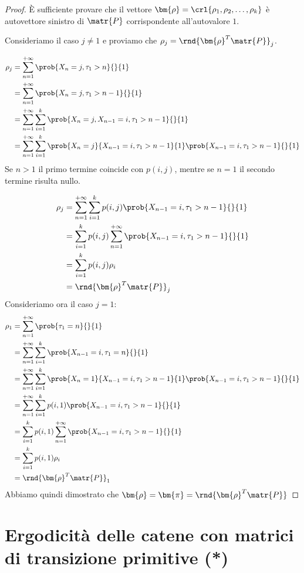\documentclass[\main/main.tex]{subfiles}
\begin{document}
\begin{proof}
	È sufficiente provare che il vettore \(\bm{\rho} = \crl{\rho_1, \rho_2, \ldots, \rho_k}\) è autovettore sinistro di \(\matr{P}\) corrispondente all'autovalore \(1\).

	Consideriamo il caso \(j \neq 1\) e proviamo che \(\rho_j = \rnd{\bm{\rho}^T\matr{P}}_j\).

	\begin{align*}
		\rho_j & = \sum_{n=1}^{+\infty} \prob{X_n = j, \tau_1 > n}{}{1}                                                                  \\
		       & = \sum_{n=1}^{+\infty} \prob{X_n = j, \tau_1 > n-1}{}{1}                                                                \\
		       & = \sum_{n=1}^{+\infty} \sum_{i=1}^{k} \prob{X_n = j, X_{n-1} = i, \tau_1 > n-1}{}{1}                                    \\
		       & = \sum_{n=1}^{+\infty} \sum_{i=1}^{k} \prob{X_n = j}{X_{n-1} = i, \tau_1 > n-1}{1}\prob{X_{n-1} = i, \tau_1 > n-1}{}{1} \\
	\end{align*}
	Se \(n>1\) il primo termine coincide con \(p(i,j)\), mentre se \(n=1\) il secondo termine risulta nullo.

	\begin{align*}
		\rho_j & = \sum_{n=1}^{+\infty} \sum_{i=1}^{k} p(i,j) \prob{X_{n-1} = i, \tau_1 > n-1}{}{1}  \\
		       & = \sum_{i=1}^{k} p(i,j)  \sum_{n=1}^{+\infty} \prob{X_{n-1} = i, \tau_1 > n-1}{}{1} \\
		       & = \sum_{i=1}^{k} p(i,j) \rho_i                                                      \\
		       & = \rnd{\bm{\rho}^T \matr{P}}_j
	\end{align*}
	Consideriamo ora il caso \(j=1\):
	\begin{align*}
		\rho_1 & = \sum_{n=1}^{+\infty} \prob{\tau_1 = n}{}{1}                                                                           \\
		       & = \sum_{n=1}^{+\infty} \sum_{i=1}^{k} \prob{X_{n-1} = i, \tau_1 = n}{}{1}                                               \\
		       & = \sum_{n=1}^{+\infty} \sum_{i=1}^{k} \prob{X_n = 1}{X_{n-1} = i, \tau_1 > n-1}{1}\prob{X_{n-1} = i, \tau_1 > n-1}{}{1} \\
		       & = \sum_{n=1}^{+\infty} \sum_{i=1}^{k} p(i,1)\prob{X_{n-1} = i, \tau_1 > n-1}{}{1}                                       \\
		       & = \sum_{i=1}^{k} p(i,1) \sum_{n=1}^{+\infty} \prob{X_{n-1} = i, \tau_1 > n-1}{}{1}                                      \\
		       & = \sum_{i=1}^{k} p(i,1) \rho_i                                                                                          \\
		       & = \rnd{\bm{\rho}^T \matr{P}}_1
	\end{align*}
	Abbiamo quindi dimostrato che \(\bm{\rho} = \bm{\pi} = \rnd{\bm{\rho}^T\matr{P}}\)
\end{proof}

\section{Ergodicità delle catene con matrici di transizione primitive (*)}
\end{document}
